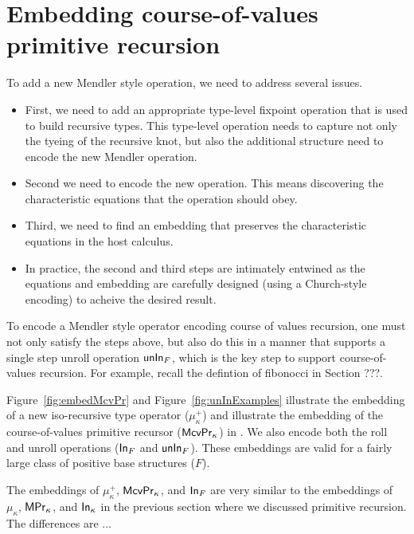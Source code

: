 \section{Embedding course-of-values primitive recursion}
\label{sec:fixi:cv}


To add a new Mendler style operation, we need to address several issues.
\begin{itemize}
\item First, we need to add an appropriate type-level fixpoint operation
that is used to build recursive types. This type-level operation needs to
capture not only the tyeing of the recursive knot, but also the additional
structure need to encode the new Mendler operation.
\item Second we need to encode the new operation. This means discovering the
characteristic equations that the operation should obey.
\item Third, we need to find an embedding that preserves the characteristic
equations in the host calculus.
\item In practice, the second and third steps are intimately entwined as
the equations and embedding are carefully designed (using a Church-style encoding)
to acheive the desired result.
\end{itemize}

To encode a Mendler style operator encoding course of values recursion,
one must not only satisfy the steps above, but also do this in a manner
that supports a single step unroll operation $\mathsf{unIn}_F$, which is the key step
to support course-of-values recursion. For example, recall the defintion
of fibonocci in Section ???.

Figure~\ref{fig:embedMcvPr} and Figure~\ref{fig:unInExamples}
illustrate the embedding of a new iso-recursive type operator ($\mu^{+}_\kappa$) and
illustrate the embedding of
the course-of-values primitive recursor ($\mathsf{McvPr}_\kappa$) in \Fixi. We also encode
both the roll and unroll operations ($\mathsf{In}_F$ and $\mathsf{unIn}_F$). These
embeddings are valid for
a fairly large class of positive base structures ($F$).

The embeddings of $\mu^{+}_\kappa$, $\mathsf{McvPr}_\kappa$, and $\mathsf{In}_F$
are very similar to the embeddings of $\mu_\kappa$, $\mathsf{MPr}_\kappa$,
and $\mathsf{In}_\kappa$ in the previous section where we discussed primitive recursion.
The differences are ...

